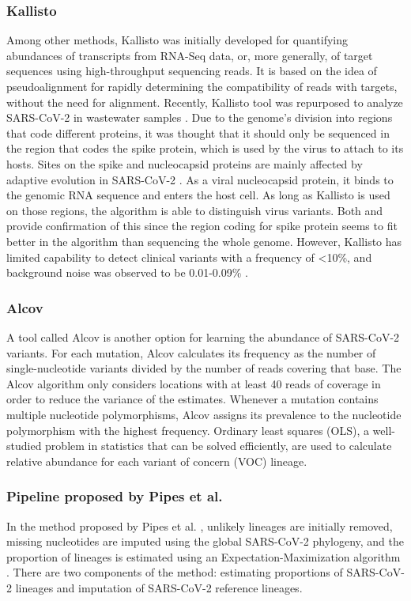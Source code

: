        \subsubsection{Kallisto}
        Among other methods, Kallisto \cite{bray2016} was initially developed for quantifying abundances of transcripts from RNA-Seq data, or, more generally, of target sequences using high-throughput sequencing reads. It is based on the idea of pseudoalignment for rapidly determining the compatibility of reads with targets, without the need for alignment. Recently, Kallisto tool was repurposed to analyze SARS-CoV-2 in wastewater samples \cite{baaijens2021,kallisto2022}. Due to the genome's division into regions that code different proteins, it was thought that it should only be sequenced in the region that codes the spike protein, which is used by the virus to attach to its hosts. Sites on the spike and nucleocapsid proteins are mainly affected by adaptive evolution in SARS-CoV-2 \cite{rochman2021}. As a viral nucleocapsid protein, it binds to the genomic RNA sequence and enters the host cell. As long as Kallisto is used on those regions, the algorithm is able to distinguish virus variants. Both \cite{baaijens2021} and \cite{anton2022} provide confirmation of this since the region coding for spike protein seems to fit better in the algorithm than sequencing the whole genome. However, Kallisto has limited capability to detect clinical variants with a frequency of <10\%, and background noise was observed to be 0.01-0.09\% \cite{baaijens2021}.
        \subsubsection{Alcov}
        A tool called Alcov \cite{ellmen2021} is another option for learning the abundance of SARS-CoV-2 variants. For each mutation, Alcov calculates its frequency as the number of single-nucleotide variants divided by the number of reads covering that base. The Alcov algorithm only considers locations with at least 40 reads of coverage in order to reduce the variance of the estimates. Whenever a mutation contains multiple nucleotide polymorphisms, Alcov assigns its prevalence to the nucleotide polymorphism with the highest frequency. Ordinary least squares (OLS), a well-studied problem in statistics that can be solved efficiently, are used to calculate relative abundance for each variant of concern (VOC) lineage. 
        \subsubsection{Pipeline proposed by Pipes et al.}
        In the method proposed by Pipes et al. \cite{pipes2022}, unlikely lineages are initially removed, missing nucleotides are imputed using the global SARS-CoV-2 phylogeny, and the proportion of lineages is estimated using an Expectation-Maximization algorithm \cite{dempster1977}. There are two components of the method: estimating proportions of SARS-CoV-2 lineages and imputation of SARS-CoV-2 reference lineages. 
